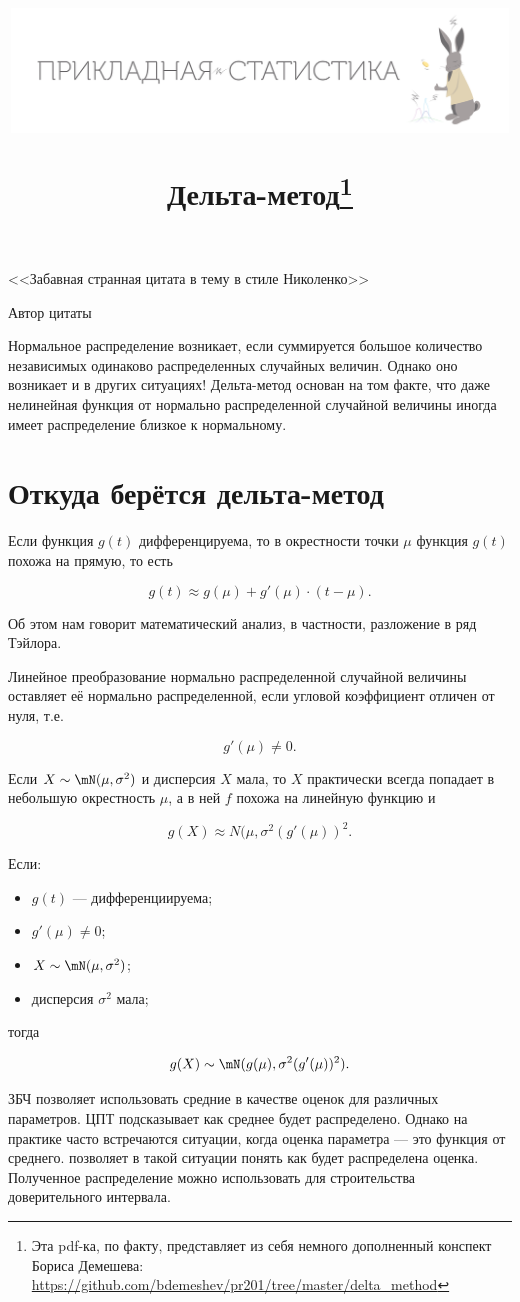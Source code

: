 \documentclass[12pt, a4paper, oneside]{article}
\title{\begin{center} \includegraphics[width=0.99\textwidth]{logo.png} \end{center} Дельта-метод\footnote{Эта pdf-ка, по факту, представляет из себя немного дополненный конспект Бориса Демешева:  \url{https://github.com/bdemeshev/pr201/tree/master/delta_method}}}
\date{ } %
\begin{document}
\maketitle

\epigraph{<<Забавная странная цитата в тему в стиле Николенко>>}{Автор цитаты}

Нормальное распределение возникает, если суммируется большое количество независимых одинаково распределенных случайных величин. Однако оно возникает и в других ситуациях! Дельта-метод основан на том факте, что даже нелинейная функция от нормально распределенной случайной величины  иногда имеет распределение близкое к нормальному.

\section*{Откуда берётся дельта-метод}

Если функция $g(t)$ дифференцируема, то в окрестности точки $\mu$ функция $g(t)$ похожа на прямую, то есть 

$$
g(t) \approx g(\mu) + g'(\mu) \cdot (t - \mu).
$$

Об этом нам говорит математический анализ, в частности, разложение в ряд Тэйлора. 

Линейное преобразование нормально распределенной случайной величины оставляет её нормально распределенной, если угловой коэффициент отличен от нуля, т.е. 

$$
g'(\mu) \neq 0.
$$ 

Если $X \sim \mN(\mu, \sigma^2)$ и  дисперсия $X$ мала, то $X$ практически всегда попадает в небольшую окрестность $\mu$, а в ней $f$ похожа на линейную функцию и 

$$
g(X) \approx N(\mu, \sigma^2 (g'(\mu))^2.
$$ 

 Если: 

\begin{itemize}
	\item  $g(t)$ --- дифференциируема;
	\item  $g'(\mu) \neq 0$;
	\item $X \sim \mN(\mu,\sigma^2)$;
	\item дисперсия $\sigma^2$ мала;
\end{itemize} 

тогда 

$$
g(X) \sim \mN(g(\mu),\sigma^2 (g'(\mu))^2).
$$


ЗБЧ позволяет использовать средние в качестве оценок для различных параметров. ЦПТ подсказывает как среднее будет распределено. Однако на практике часто встречаются ситуации, когда оценка параметра --- это функция от среднего.   позволяет в такой ситуации понять как будет распределена оценка. Полученное распределение можно использовать для строительства доверительного интервала. 
\end{document}
